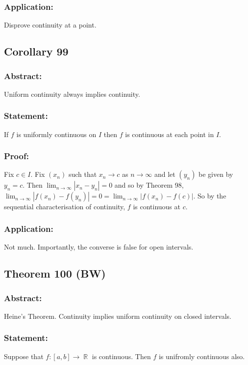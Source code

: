 \documentclass{article}
\DeclareMathOperator\R{\mathbb{R}}
\begin{document}
\subsubsection*{Application:}
Disprove continuity at a point.

\subsection*{Corollary 99}
\subsubsection*{Abstract:}
Uniform continuity always implies continuity.
\subsubsection*{Statement:}
If $f$ is uniformly continuous on $I$ then $f$ is continuous at each point in $I$.
\subsubsection*{Proof:}
Fix $c \in I$. Fix $(x_n)$ such that $x_n \to c$ as $n \to \infty$ and let $(y_n)$
be given by $y_n = c$. Then $\lim_{n \to \infty}|x_n-y_n| = 0$ and so
by Theorem 98, $\lim_{n \to \infty}|f(x_n)-f(y_n)| = 0 = \lim_{n \to \infty}|f(x_n) - f(c)|$. So
by the sequential characterisation of continuity, $f$ is continuous at $c$.
\subsubsection*{Application:}
Not much. Importantly, the converse is false for open intervals.
\subsection{Theorem 100 (BW)}
\subsubsection*{Abstract:}
Heine's Theorem. Continuity implies uniform continuity on closed intervals.
\subsubsection*{Statement:}
Suppose that $f:[a,b] \to \R$ is continuous. Then $f$ is unifromly continuous also.
\end{document}
